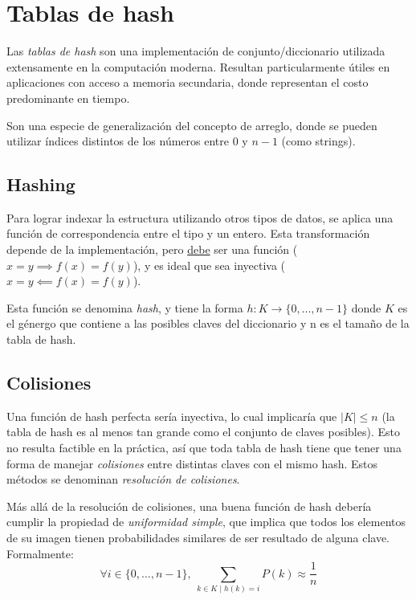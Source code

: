 \documentclass{article}
\begin{document}
    \section{Tablas de hash}
    \label{sec-hash-tables}

    Las \textit{tablas de hash} son una implementación de conjunto/diccionario utilizada extensamente en la computación moderna. Resultan particularmente útiles en aplicaciones con acceso a memoria secundaria, donde representan el costo predominante en tiempo.

    Son una especie de generalización del concepto de arreglo, donde se pueden utilizar índices distintos de los números entre $0$ y $n-1$ (como strings).

    \subsection{Hashing}

    Para lograr indexar la estructura utilizando otros tipos de datos, se aplica una función de correspondencia entre el tipo y un entero. Esta transformación depende de la implementación, pero \underline{debe} ser una función ($x = y \implies f(x) = f(y)$), y es ideal que sea inyectiva ($x = y \impliedby f(x) = f(y)$).

    Esta función se denomina \textit{hash}, y tiene la forma $h: K \rightarrow \{0, ..., n-1\}$ donde $K$ es el génergo que contiene a las posibles claves del diccionario y n es el tamaño de la tabla de hash.

    \subsection{Colisiones}

    Una función de hash perfecta sería inyectiva, lo cual implicaría que $|K| \leq n$ (la tabla de hash es al menos tan grande como el conjunto de claves posibles). Esto no resulta factible en la práctica, así que toda tabla de hash tiene que tener una forma de manejar \textit{colisiones} entre distintas claves con el mismo hash. Estos métodos se denominan \textit{resolución de colisiones}.

    Más allá de la resolución de colisiones, una buena función de hash debería cumplir la propiedad de \textit{uniformidad simple}, que implica que todos los elementos de su imagen tienen probabilidades similares de ser resultado de alguna clave. Formalmente:
$$\forall i \in \{0, ..., n-1\},\ \sum_{k \in K \mid h(k) = i} P(k) \approx \frac{1}{n}$$
\end{document}
